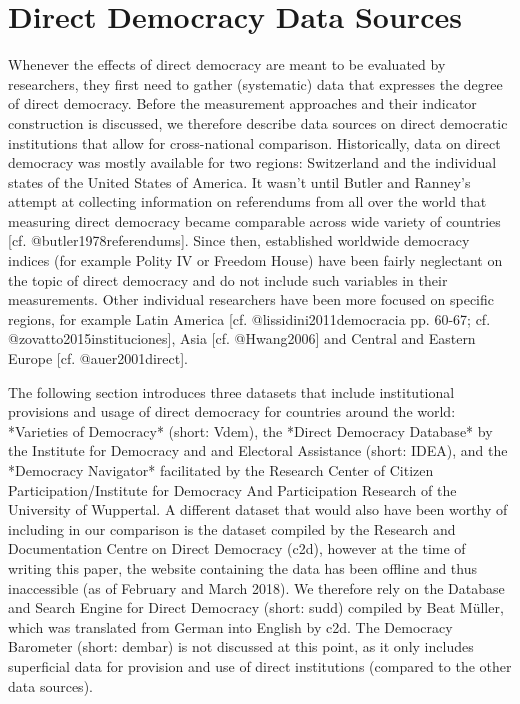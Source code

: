 \documentclass{systats}
\begin{document}
\newpage
\section{Direct Democracy Data Sources} \label{data}

Whenever the effects of direct democracy are meant to be evaluated by researchers, they first need to gather (systematic) data that expresses the degree of direct democracy. Before the measurement approaches and their indicator construction is discussed, we therefore describe data sources on direct democratic institutions that allow for cross-national comparison. Historically, data on direct democracy was mostly available for two regions: Switzerland and the individual states of the United States of America. It wasn’t until Butler and Ranney’s attempt at collecting information on referendums from all over the world that measuring direct democracy became comparable across wide variety of countries [cf. @butler1978referendums]. Since then, established worldwide democracy indices (for example Polity IV or Freedom House) have been fairly neglectant on the topic of direct democracy and do not include such variables in their measurements.  Other individual researchers have been more focused on specific regions, for example Latin America [cf. @lissidini2011democracia pp. 60-67; cf. @zovatto2015instituciones], Asia [cf. @Hwang2006] and Central and Eastern Europe [cf. @auer2001direct].

The following section introduces three datasets that include institutional provisions and usage of direct democracy for countries around the world: *Varieties of Democracy* (short: Vdem), the *Direct Democracy Database* by the Institute for Democracy and and Electoral Assistance (short: IDEA), and the *Democracy Navigator*  facilitated by the Research Center of Citizen Participation/Institute for Democracy And Participation Research of the University of Wuppertal.  A different dataset that would also have been worthy of including in our comparison is the dataset compiled by the Research and Documentation Centre on Direct Democracy (c2d), however at the time of writing this paper, the website containing the data has been offline and thus inaccessible (as of February and March 2018). We therefore rely on the Database and Search Engine for Direct Democracy (short: sudd) compiled by Beat Müller, which was translated from German into English by c2d. The Democracy Barometer (short: dembar) is not discussed at this point, as it only includes superficial data for provision and use of direct institutions (compared to the other data sources).
\end{document}
